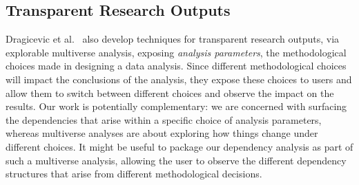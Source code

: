 \subsection{Transparent Research Outputs}

Dragicevic et al.~\cite{dragicevic19} also develop techniques for transparent research outputs, via explorable
multiverse analysis, exposing \emph{analysis parameters}, the methodological choices made in designing a data
analysis. Since different methodological choices will impact the conclusions of the analysis, they expose
these choices to users and allow them to switch between different choices and observe the impact on the
results. Our work is potentially complementary: we are concerned with surfacing the dependencies that arise
within a specific choice of analysis parameters, whereas multiverse analyses are about exploring how things
change under different choices. It might be useful to package our dependency analysis as part of such a
multiverse analysis, allowing the user to observe the different dependency structures that arise from
different methodological decisions.
